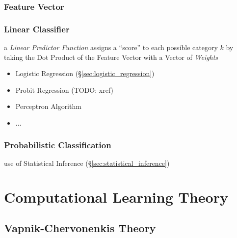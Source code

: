 \subsubsection{Feature Vector}\label{sec:feature_vector}

\subsubsection{Linear Classifier}\label{sec:linear_classifier}

a \emph{Linear Predictor Function} assigns a ``score'' to each possible category
$k$ by taking the Dot Product of the Feature Vector with a Vector of
\emph{Weights}

\begin{itemize}
\item Logistic Regression (\S\ref{sec:logistic_regression})
\item Probit Regression (TODO: xref)
\item Perceptron Algorithm
\item ...
\end{itemize}



\subsubsection{Probabilistic Classification}
\label{sec:probabilistic_classification}

use of Statistical Inference (\S\ref{sec:statistical_inference})



\section{Computational Learning Theory}\label{sec:computational_learning_theory}




\subsection{Vapnik-Chervonenkis Theory}\label{sec:vc_theory}

